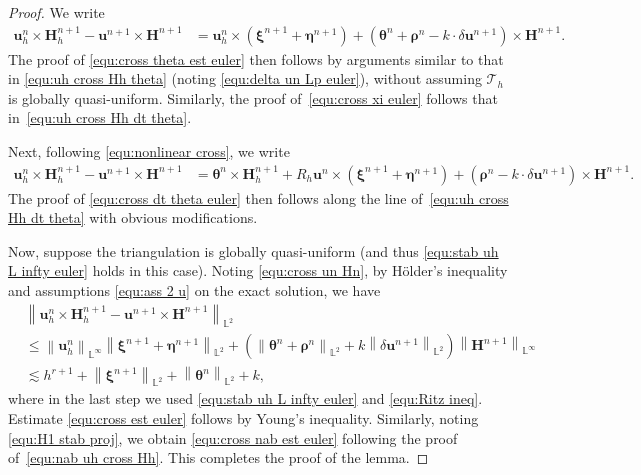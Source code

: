 \documentclass[11pt, reqno]{amsart}
\theoremstyle{definition}
\theoremstyle{remark}
\numberwithin{equation}{section}
\newcommand{\bff}{\boldsymbol}
\newcommand{\bb}{\mathbb}
\newcommand{\norm}[2]{\left\|{#1}\right\|_{#2}}
\begin{document}
\begin{proof}
	We write
	\begin{align}\label{equ:cross un Hn}
		\bff{u}_h^{n} \times \bff{H}_h^{n+1} - \bff{u}^{n+1} \times \bff{H}^{n+1}
		&=
		\bff{u}_h^{n} \times \left(\bff{\xi}^{n+1}+\bff{\eta}^{n+1}\right)
		+
		\left(\bff{\theta}^{n} + \bff{\rho}^{n} - k\cdot \delta \bff{u}^{n+1}\right) \times \bff{H}^{n+1}.
	\end{align}
	The proof of \eqref{equ:cross theta est euler} then follows by arguments similar to that in \eqref{equ:uh cross Hh theta} (noting \eqref{equ:delta un Lp euler}), without assuming $\mathcal{T}_h$ is globally quasi-uniform. Similarly, the proof of~\eqref{equ:cross xi euler} follows that in~\eqref{equ:uh cross Hh dt theta}.
	
	Next, following \eqref{equ:nonlinear cross}, we write
	\begin{align*}
		\bff{u}_h^{n} \times \bff{H}_h^{n+1} - \bff{u}^{n+1} \times \bff{H}^{n+1}
		&=
		\bff{\theta}^n \times \bff{H}_h^{n+1}
		+
		R_h\bff{u}^n \times (\bff{\xi}^{n+1}+\bff{\eta}^{n+1})
		+
		(\bff{\rho}^n- k \cdot \delta \bff{u}^{n+1}) \times \bff{H}^{n+1}.
	\end{align*}
	The proof of \eqref{equ:cross dt theta euler} then follows along the line of~\eqref{equ:uh cross Hh dt theta} with obvious modifications.
	
	Now, suppose the triangulation is globally quasi-uniform (and thus \eqref{equ:stab uh L infty euler} holds in this case). Noting \eqref{equ:cross un Hn}, by H\"older's inequality and assumptions \eqref{equ:ass 2 u} on the exact solution, we have
	\begin{align*}
		\nonumber
		&\norm{\bff{u}_h^{n} \times \bff{H}_h^{n+1} - \bff{u}^{n+1} \times \bff{H}^{n+1}}{\bb{L}^2}
		\\
		\nonumber
		&\leq
		\norm{\bff{u}_h^{n}}{\bb{L}^\infty} \norm{\bff{\xi}^{n+1}+\bff{\eta}^{n+1}}{\bb{L}^2}
		+
		\left( \norm{\bff{\theta}^{n} + \bff{\rho}^{n}}{\bb{L}^2} + k \norm{\delta \bff{u}^{n+1}}{\bb{L}^2} \right) \norm{\bff{H}^{n+1}}{\bb{L}^\infty}
		\\
		&\lesssim
		h^{r+1} + \norm{\bff{\xi}^{n+1}}{\bb{L}^2}
		+ \norm{\bff{\theta}^n}{\bb{L}^2} + k,
	\end{align*}
	where in the last step we used \eqref{equ:stab uh L infty euler} and \eqref{equ:Ritz ineq}. Estimate \eqref{equ:cross est euler} follows by Young's inequality.
	Similarly, noting \eqref{equ:H1 stab proj}, we obtain \eqref{equ:cross nab est euler} following the proof of~\eqref{equ:nab uh cross Hh}. This completes the proof of the lemma.
\end{proof}
\end{document}
